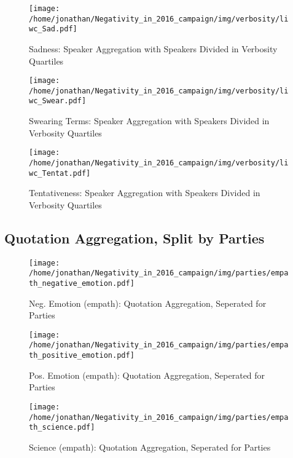 \begin{figure}[h]\centering
	\texttt{[image: /home/jonathan/Negativity\_in\_2016\_campaign/img/verbosity/liwc\_Sad.pdf]}
	\caption{Sadness: Speaker Aggregation with Speakers Divided in Verbosity Quartiles}
	\label{fig: verbosity_Sadness}
\end{figure}

\begin{figure}[h]\centering
	\texttt{[image: /home/jonathan/Negativity\_in\_2016\_campaign/img/verbosity/liwc\_Swear.pdf]}
	\caption{Swearing Terms: Speaker Aggregation with Speakers Divided in Verbosity Quartiles}
	\label{fig: verbosity_Swearing Terms}
\end{figure}

\begin{figure}[h]\centering
	\texttt{[image: /home/jonathan/Negativity\_in\_2016\_campaign/img/verbosity/liwc\_Tentat.pdf]}
	\caption{Tentativeness: Speaker Aggregation with Speakers Divided in Verbosity Quartiles}
	\label{fig: verbosity_Tentativeness}
\end{figure}

\clearpage
\pagebreak

\subsection{Quotation Aggregation, Split by Parties}

\begin{figure}[h]\centering
	\texttt{[image: /home/jonathan/Negativity\_in\_2016\_campaign/img/parties/empath\_negative\_emotion.pdf]}
	\caption{Neg. Emotion (empath): Quotation Aggregation, Seperated for Parties}
	\label{fig: parties_Neg. Emotion (empath)}
\end{figure}

\begin{figure}[h]\centering
	\texttt{[image: /home/jonathan/Negativity\_in\_2016\_campaign/img/parties/empath\_positive\_emotion.pdf]}
	\caption{Pos. Emotion (empath): Quotation Aggregation, Seperated for Parties}
	\label{fig: parties_Pos. Emotion (empath)}
\end{figure}

\begin{figure}[h]\centering
	\texttt{[image: /home/jonathan/Negativity\_in\_2016\_campaign/img/parties/empath\_science.pdf]}
	\caption{Science (empath): Quotation Aggregation, Seperated for Parties}
	\label{fig: parties_Science (empath)}
\end{figure}

